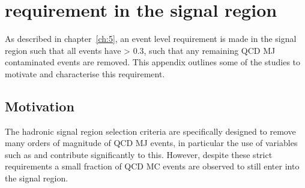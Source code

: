 \label{ch:app_dphistar}


\chapter{\mindphistar requirement in the signal region}

As described in chapter~\ref{ch:5}, an event level requirement is made in the
signal region such that all events have \mindphistar > 0.3, such that any
remaining QCD MJ contaminated events are removed. This appendix outlines some of
the studies to motivate and characterise this requirement.

\section{Motivation}

The hadronic signal region selection criteria are specifically
designed to remove many orders of magnitude of QCD MJ events, in particular the
use of variables such as \alphat and \mhtmet contribute significantly to this.
However, despite these strict requirements a small fraction of QCD MC events are
observed to still enter into the signal region.

